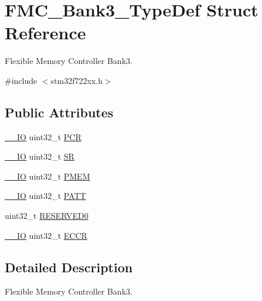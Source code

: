 \hypertarget{struct_f_m_c___bank3___type_def}{}\section{F\+M\+C\+\_\+\+Bank3\+\_\+\+Type\+Def Struct Reference}
\label{struct_f_m_c___bank3___type_def}


Flexible Memory Controller Bank3.  




{\ttfamily \#include $<$stm32f722xx.\+h$>$}

\subsection*{Public Attributes}
\begin{DoxyCompactItemize}
\item 
\mbox{\hyperlink{core__sc300_8h_aec43007d9998a0a0e01faede4133d6be}{\+\_\+\+\_\+\+IO}} uint32\+\_\+t \mbox{\hyperlink{struct_f_m_c___bank3___type_def_ad7e74bf59532cbe667231e321bdf0de2}{P\+CR}}
\item 
\mbox{\hyperlink{core__sc300_8h_aec43007d9998a0a0e01faede4133d6be}{\+\_\+\+\_\+\+IO}} uint32\+\_\+t \mbox{\hyperlink{struct_f_m_c___bank3___type_def_a43af4c901144f747741adbf1a479586a}{SR}}
\item 
\mbox{\hyperlink{core__sc300_8h_aec43007d9998a0a0e01faede4133d6be}{\+\_\+\+\_\+\+IO}} uint32\+\_\+t \mbox{\hyperlink{struct_f_m_c___bank3___type_def_af34d82c290385286c11648a983ab3e71}{P\+M\+EM}}
\item 
\mbox{\hyperlink{core__sc300_8h_aec43007d9998a0a0e01faede4133d6be}{\+\_\+\+\_\+\+IO}} uint32\+\_\+t \mbox{\hyperlink{struct_f_m_c___bank3___type_def_a4cca3d0ef62651cc93d4070278bb5376}{P\+A\+TT}}
\item 
uint32\+\_\+t \mbox{\hyperlink{struct_f_m_c___bank3___type_def_a0d8de7951a4d20a659b4d3abe76bd78f}{R\+E\+S\+E\+R\+V\+E\+D0}}
\item 
\mbox{\hyperlink{core__sc300_8h_aec43007d9998a0a0e01faede4133d6be}{\+\_\+\+\_\+\+IO}} uint32\+\_\+t \mbox{\hyperlink{struct_f_m_c___bank3___type_def_ab6c1398fb7158f021ab78a4231c67054}{E\+C\+CR}}
\end{DoxyCompactItemize}


\subsection{Detailed Description}
Flexible Memory Controller Bank3. 

